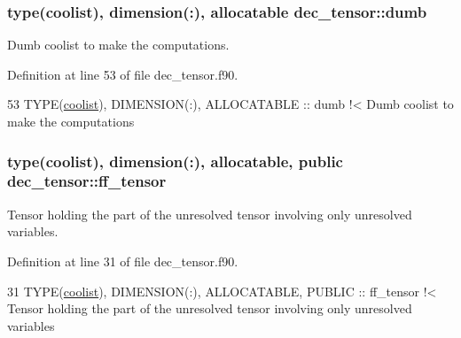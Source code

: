 \subsubsection[{\texorpdfstring{dumb}{dumb}}]{\setlength{\rightskip}{0pt plus 5cm}type({\bf coolist}), dimension(\+:), allocatable dec\+\_\+tensor\+::dumb\hspace{0.3cm}{\ttfamily [private]}}\hypertarget{namespacedec__tensor_a63c533216b73ee87a50205bfa5adecea}{}\label{namespacedec__tensor_a63c533216b73ee87a50205bfa5adecea}


Dumb coolist to make the computations. 



Definition at line 53 of file dec\+\_\+tensor.\+f90.


\begin{DoxyCode}
53   \textcolor{keywordtype}{TYPE}(\hyperlink{structtensor_1_1coolist}{coolist}), \textcolor{keywordtype}{DIMENSION(:)}, \textcolor{keywordtype}{ALLOCATABLE} :: dumb\textcolor{comment}{ !< Dumb coolist to make the computations}
\end{DoxyCode}
\subsubsection[{\texorpdfstring{ff\+\_\+tensor}{ff_tensor}}]{\setlength{\rightskip}{0pt plus 5cm}type({\bf coolist}), dimension(\+:), allocatable, public dec\+\_\+tensor\+::ff\+\_\+tensor}\hypertarget{namespacedec__tensor_ac70c58053d278b0c95194704a1e48787}{}\label{namespacedec__tensor_ac70c58053d278b0c95194704a1e48787}


Tensor holding the part of the unresolved tensor involving only unresolved variables. 



Definition at line 31 of file dec\+\_\+tensor.\+f90.


\begin{DoxyCode}
31   \textcolor{keywordtype}{TYPE}(\hyperlink{structtensor_1_1coolist}{coolist}), \textcolor{keywordtype}{DIMENSION(:)}, \textcolor{keywordtype}{ALLOCATABLE}, \textcolor{keywordtype}{PUBLIC} :: ff\_tensor\textcolor{comment}{ !< Tensor holding the part of the
       unresolved tensor involving only unresolved variables}
\end{DoxyCode}
